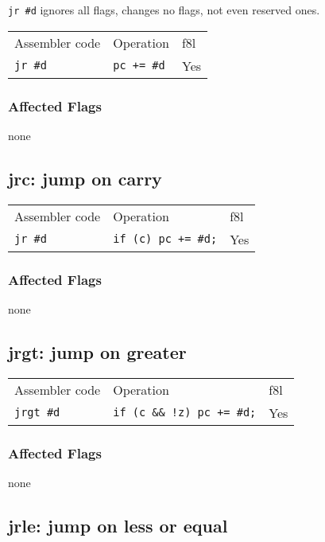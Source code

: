 \documentclass{book}
\begin{document}
\texttt{jr \#d} ignores all flags, changes no flags, not even reserved ones.

\begin{tabular}{l l l}
Assembler code  & Operation          & f8l \\
\texttt{jr \#d} & \texttt{pc += \#d} & Yes \\
\end{tabular}

\subsubsection*{Affected Flags}

none


\subsection{jrc: jump on carry}

\begin{tabular}{l l l}
Assembler code  & Operation                  & f8l \\
\texttt{jr \#d} & \texttt{if (c) pc += \#d;} & Yes \\
\end{tabular}

\subsubsection*{Affected Flags}

none


\subsection{jrgt: jump on greater}

\begin{tabular}{l l l}
Assembler code    & Operation                        & f8l \\
\texttt{jrgt \#d} & \texttt{if (c \&\& !z) pc += \#d;} & Yes \\
\end{tabular}

\subsubsection*{Affected Flags}

none

\subsection{jrle: jump on less or equal}
\end{document}
